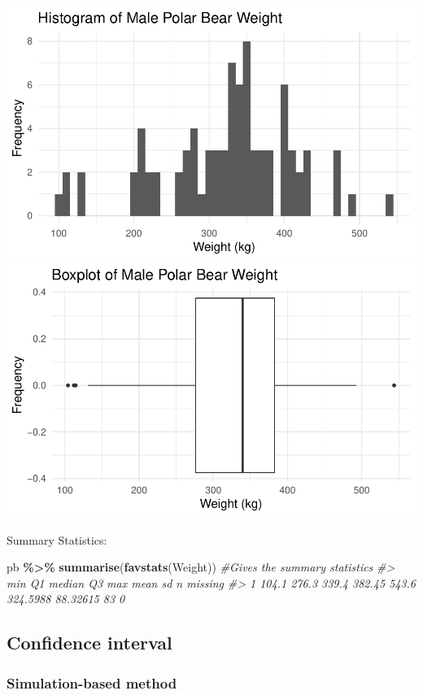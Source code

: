 \documentclass[
]{report}
\newenvironment{Shaded}{\begin{snugshade}}{\end{snugshade}}
\newcommand{\CommentTok}[1]{\textcolor[rgb]{0.56,0.35,0.01}{\textit{#1}}}
\newcommand{\FunctionTok}[1]{\textcolor[rgb]{0.13,0.29,0.53}{\textbf{#1}}}
\newcommand{\NormalTok}[1]{#1}
\newcommand{\SpecialCharTok}[1]{\textcolor[rgb]{0.81,0.36,0.00}{\textbf{#1}}}
\begin{document}
\begin{center}\includegraphics[width=0.6\linewidth]{07-VN07-one_meantheory_files/figure-latex/unnamed-chunk-2-1} \includegraphics[width=0.6\linewidth]{07-VN07-one_meantheory_files/figure-latex/unnamed-chunk-2-2} \end{center}

Summary Statistics:

\begin{Shaded}
\begin{Highlighting}[]
\NormalTok{pb }\SpecialCharTok{\%\textgreater{}\%}
  \FunctionTok{summarise}\NormalTok{(}\FunctionTok{favstats}\NormalTok{(Weight)) }\CommentTok{\#Gives the summary statistics}
\CommentTok{\#\textgreater{}     min    Q1 median     Q3   max     mean       sd  n missing}
\CommentTok{\#\textgreater{} 1 104.1 276.3  339.4 382.45 543.6 324.5988 88.32615 83       0}
\end{Highlighting}
\end{Shaded}

\subsection*{Confidence interval}\label{confidence-interval}

\subsubsection*{Simulation-based method}\label{simulation-based-method-3}
\end{document}
